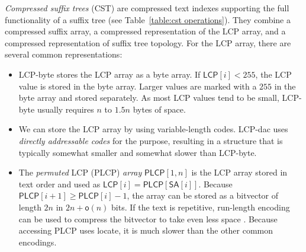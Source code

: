 \documentclass[a4paper,11pt]{llncs}
\newcommand{\CST}{\textsf{CST}}
\newcommand{\mSA}{\ensuremath{\mathsf{SA}}}
\newcommand{\LCP}{\textsf{LCP}}
\newcommand{\PLCP}{\textsf{PLCP}}
\newcommand{\LCPbyte}{\textsf{LCP\nobreakdash-byte}}
\newcommand{\LCPdac}{\textsf{LCP\nobreakdash-dac}}
\newcommand{\mLCP}{\ensuremath{\mathsf{LCP}}}
\newcommand{\mPLCP}{\ensuremath{\mathsf{PLCP}}}
\newcommand{\locate}{\textsf{locate}}
\newcommand{\oh}{\ensuremath{\mathsf{o}}}
\begin{document}
\emph{Compressed suffix trees} (\CST) \cite{Sadakane2007} are compressed text indexes supporting the full functionality of a suffix tree (see Table~\ref{table:cst operations}). They combine a compressed suffix array, a compressed representation of the \LCP{} array, and a compressed representation of suffix tree topology. For the \LCP{} array, there are several common representations:
\begin{itemize}
\item \LCPbyte{} \cite{Abouelhoda2004} stores the \LCP{} array as a byte array. If $\mLCP[i] < 255$, the \LCP{} value is stored in the byte array. Larger values are marked with a $255$ in the byte array and stored separately. As most \LCP{} values tend to be small, \LCPbyte{} usually requires $n$ to $1.5n$ bytes of space.
\item We can store the \LCP{} array by using variable-length codes. \LCPdac{} uses \emph{directly addressable codes} \cite{Brisaboa2009} for the purpose, resulting in a structure that is typically somewhat smaller and somewhat slower than \LCPbyte.
\item The \emph{permuted} \LCP{} (\PLCP) \emph{array} \cite{Sadakane2007} $\mPLCP[1,n]$ is the \LCP{} array stored in text order and used as $\mLCP[i] = \mPLCP[\mSA[i]]$. Because $\mPLCP[i+1] \ge \mPLCP[i]-1$, the array can be stored as a bitvector of length $2n$ in $2n+\oh(n)$ bits. If the text is repetitive, run-length encoding can be used to compress the bitvector to take even less space \cite{Fischer2009a}. Because accessing \PLCP{} uses \locate, it is much slower than the other common encodings.
\end{itemize}
\end{document}
